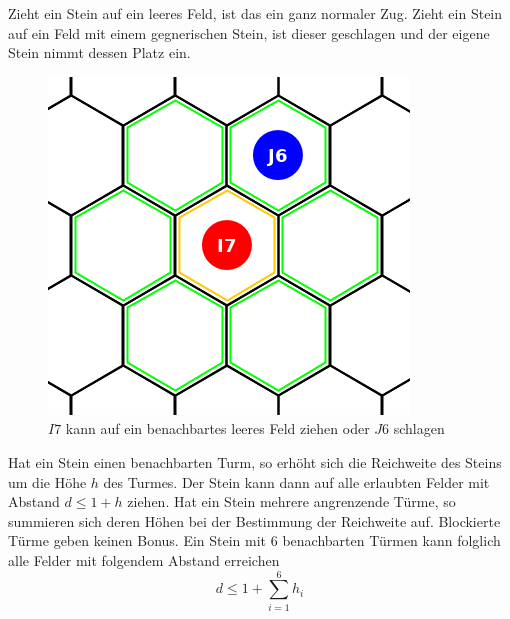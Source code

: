 Zieht ein Stein auf ein leeres Feld, ist das ein ganz normaler Zug. Zieht ein Stein auf ein Feld mit einem gegnerischen Stein, ist dieser geschlagen und der eigene Stein nimmt dessen Platz ein.
\begin{figure}[ht]
\begin{center}
\includegraphics[scale=0.3]{graphic/token-move-kick.png}
\end{center}
\caption*{$I7$ kann auf ein benachbartes leeres Feld ziehen oder $J6$ schlagen}
\end{figure}
\newpage

Hat ein Stein einen benachbarten Turm, so erhöht sich die Reichweite des Steins um die Höhe $h$ des Turmes. Der Stein kann dann auf alle erlaubten Felder mit Abstand $d \le 1 + h$ ziehen. Hat ein Stein mehrere angrenzende Türme, so summieren sich deren Höhen bei der Bestimmung der Reichweite auf. Blockierte Türme geben keinen Bonus. Ein Stein mit $6$ benachbarten Türmen kann folglich alle Felder mit folgendem Abstand erreichen \[d \le 1 + \sum_{i=1}^6 h_i\]

